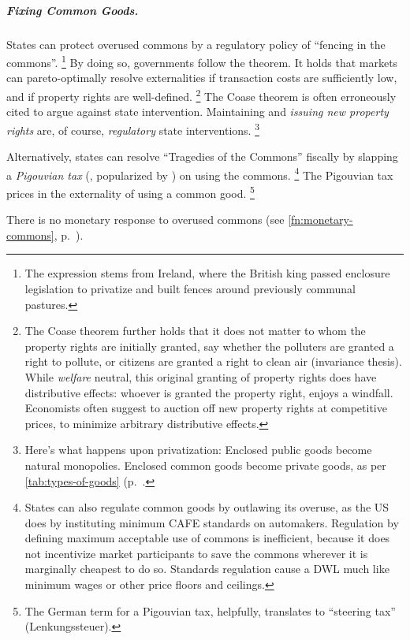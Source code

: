 \subparagraph{Fixing Common Goods.}  \label{sec:common-good-response}
States can protect overused commons by a regulatory policy of ``fencing in the commons''.
\footnote{
	The expression stems from Ireland, where the British king passed enclosure legislation to privatize and built fences around previously communal pastures.
}
By doing so, governments follow the \cite{Coase1960} theorem.
It holds that markets can pareto-optimally resolve externalities if transaction costs are sufficiently low, and if property rights are well-defined.
\footnote{
	The Coase theorem further holds that it does not matter to whom the property rights are initially granted, say whether the polluters are granted a right to pollute, or citizens are granted a right to clean air (invariance thesis).
	While \emph{welfare} neutral, this original granting of property rights does have distributive effects:
	whoever is granted the property right, enjoys a windfall.
	Economists often suggest to auction off new property rights at competitive prices, to minimize arbitrary distributive effects.%
}
The Coase theorem is often erroneously cited to argue against state intervention.
Maintaining and \emph{issuing new property rights} are, of course, \emph{regulatory} state interventions.
\footnote{
	Here's what happens upon privatization:
	Enclosed public goods become natural monopolies.
	Enclosed common goods become private goods, as per \autoref{tab:types-of-goods} (p.~\pageref{tab:types-of-goods}.
}

Alternatively, states can resolve ``Tragedies of the Commons'' \citep{Hardin-1968-aa} fiscally by slapping a \emph{Pigouvian tax} (\citealt{Pigou1912}, popularized by \citealt{Baumol1972}) on using the commons.
\footnote{
	States can also regulate common goods by outlawing its overuse, as the US does by instituting minimum \gls{CAFE} standards on automakers.
	Regulation by defining maximum acceptable use of commons is inefficient, because it does not incentivize market participants to save the commons wherever it is marginally cheapest to do so.
	Standards regulation cause a \gls{DWL} much like minimum wages or other price floors and ceilings.
}
The Pigouvian tax prices in the externality of using a common good.
\footnote{
	The German term for a Pigouvian tax, helpfully, translates to ``steering tax'' (Lenkungssteuer).
}

There is no monetary response to overused commons (see \autoref{fn:monetary-commons}, p.~\pageref{fn:monetary-commons}).

